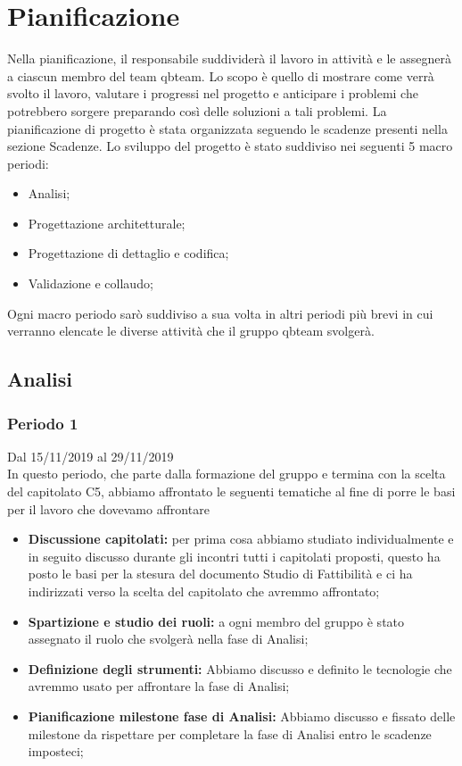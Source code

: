 \section{Pianificazione}
Nella pianificazione, il responsabile suddividerà il lavoro in attività e le assegnerà a ciascun membro del team qbteam.
Lo scopo è quello di mostrare come verrà svolto il lavoro, valutare i progressi nel progetto e anticipare i problemi che potrebbero sorgere preparando così delle soluzioni a tali problemi. 
La pianificazione di progetto è stata organizzata seguendo le scadenze presenti nella sezione Scadenze.
Lo sviluppo del progetto è stato suddiviso nei seguenti 5 macro periodi: 
\begin{itemize}
	\item Analisi;
	\item Progettazione architetturale;
	\item Progettazione di dettaglio e codifica;
	\item Validazione e collaudo;
\end{itemize}
Ogni macro periodo sarò suddiviso a sua volta in altri periodi più brevi in cui verranno elencate le diverse attività che il gruppo qbteam svolgerà.


\subsection{Analisi}

\subsubsection{Periodo 1} 
Dal 15/11/2019 al 29/11/2019\\
In questo periodo, che parte dalla formazione del gruppo e termina con la scelta del capitolato C5, abbiamo affrontato le seguenti tematiche al fine di porre le basi per il lavoro che dovevamo affrontare\\
\begin{itemize}
	\item \textbf{Discussione capitolati:} per prima cosa abbiamo studiato individualmente e in seguito discusso durante gli incontri tutti i capitolati proposti, questo ha posto le basi per la stesura del documento Studio di Fattibilità e ci ha indirizzati verso la scelta del capitolato che avremmo affrontato;
	\item \textbf{Spartizione e studio dei ruoli:} a ogni membro del gruppo è stato assegnato il ruolo che svolgerà nella fase di Analisi;
	\item \textbf{Definizione degli strumenti:} Abbiamo discusso e definito le tecnologie che avremmo usato per affrontare la fase di Analisi;
	\item \textbf{Pianificazione milestone fase di Analisi:} Abbiamo discusso e fissato delle milestone da rispettare per completare la fase di Analisi entro le scadenze imposteci;
\end{itemize}
